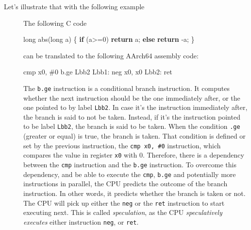\documentclass[a4paper,]{report}
\newenvironment{Shaded}{}{}
\newcommand{\BuiltInTok}[1]{#1}
\newcommand{\ControlFlowTok}[1]{\textcolor[rgb]{0.00,0.44,0.13}{\textbf{#1}}}
\newcommand{\DataTypeTok}[1]{\textcolor[rgb]{0.56,0.13,0.00}{#1}}
\newcommand{\DecValTok}[1]{\textcolor[rgb]{0.25,0.63,0.44}{#1}}
\newcommand{\FunctionTok}[1]{\textcolor[rgb]{0.02,0.16,0.49}{#1}}
\newcommand{\NormalTok}[1]{#1}
\begin{document}
\begin{description}
\item[Let's illustrate that with the following example]
The following C code

\begin{Shaded}
\begin{Highlighting}[]
\DataTypeTok{long}\NormalTok{ abs(}\DataTypeTok{long}\NormalTok{ a) \{}
  \ControlFlowTok{if}\NormalTok{ (a>=}\DecValTok{0}\NormalTok{)}
    \ControlFlowTok{return}\NormalTok{ a;}
  \ControlFlowTok{else}
    \ControlFlowTok{return}\NormalTok{ -a;}
\NormalTok{  \}}
\end{Highlighting}
\end{Shaded}

can be translated to the following AArch64 assembly code:

\begin{Shaded}
\begin{Highlighting}[]
        \BuiltInTok{cmp}\NormalTok{     x0, #}\DecValTok{0}
\NormalTok{        b.ge    Lbb2}
\FunctionTok{Lbb1:}
        \BuiltInTok{neg}\NormalTok{     x0, x0}
\FunctionTok{Lbb2:}
        \BuiltInTok{ret}
\end{Highlighting}
\end{Shaded}

The \texttt{b.ge} instruction is a conditional branch instruction. It
computes whether the next instruction should be the one immediately
after, or the one pointed to by label \texttt{Lbb2}. In case it's the
instruction immediately after, the branch is said to not be taken.
Instead, if it's the instruction pointed to be label \texttt{Lbb2}, the
branch is said to be taken. When the condition \texttt{.ge} (greater or
equal) is true, the branch is taken. That condition is defined or set by
the previous instruction, the \texttt{cmp\ x0,\ \#0} instruction, which
compares the value in register \texttt{x0} with 0. Therefore, there is a
dependency between the \texttt{cmp} instruction and the \texttt{b.ge}
instruction. To overcome this dependency, and be able to execute the
\texttt{cmp}, \texttt{b.ge} and potentially more instructions in
parallel, the CPU predicts the outcome of the branch instruction. In
other words, it predicts whether the branch is taken or not. The CPU
will pick up either the \texttt{neg} or the \texttt{ret} instruction to
start executing next. This is called \emph{speculation}, as the CPU
\emph{speculatively executes} either instruction \texttt{neg}, or
\texttt{ret}.
\end{description}
\end{document}
